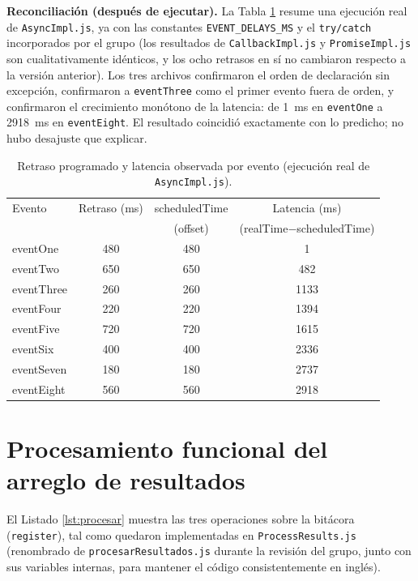 \documentclass[conference,a4paper]{IEEEtran}
\begin{document}
\textbf{Reconciliaci\'on (despu\'es de ejecutar).} La Tabla \ref{tab:latencias} resume una ejecuci\'on real de \texttt{AsyncImpl.js}, ya con las constantes \texttt{EVENT\_DELAYS\_MS} y el \texttt{try/catch} incorporados por el grupo (los resultados de \texttt{CallbackImpl.js} y \texttt{PromiseImpl.js} son cualitativamente id\'enticos, y los ocho retrasos en s\'i no cambiaron respecto a la versi\'on anterior). Los tres archivos confirmaron el orden de declaraci\'on sin excepci\'on, confirmaron a \texttt{eventThree} como el primer evento fuera de orden, y confirmaron el crecimiento mon\'otono de la latencia: de 1~ms en \texttt{eventOne} a 2918~ms en \texttt{eventEight}. El resultado coincidi\'o exactamente con lo predicho; no hubo desajuste que explicar.

\begin{table}[t]
\centering
\caption{Retraso programado y latencia observada por evento (ejecuci\'on real de \texttt{AsyncImpl.js}).}
\label{tab:latencias}
\begin{tabular}{lccc}
\toprule
Evento & Retraso (ms) & scheduledTime & Latencia (ms) \\
       &              & (offset)      & (realTime$-$scheduledTime) \\
\midrule
eventOne   & 480 & 480 & 1 \\
eventTwo   & 650 & 650 & 482 \\
eventThree & 260 & 260 & 1133 \\
eventFour  & 220 & 220 & 1394 \\
eventFive  & 720 & 720 & 1615 \\
eventSix   & 400 & 400 & 2336 \\
eventSeven & 180 & 180 & 2737 \\
eventEight & 560 & 560 & 2918 \\
\bottomrule
\end{tabular}
\end{table}

\section{Procesamiento funcional del arreglo de resultados}
\label{sec:procesamiento}
El Listado \ref{lst:procesar} muestra las tres operaciones sobre la bit\'acora (\texttt{register}), tal como quedaron implementadas en \texttt{ProcessResults.js} (renombrado de \texttt{procesarResultados.js} durante la revisi\'on del grupo, junto con sus variables internas, para mantener el c\'odigo consistentemente en ingl\'es).
\end{document}
